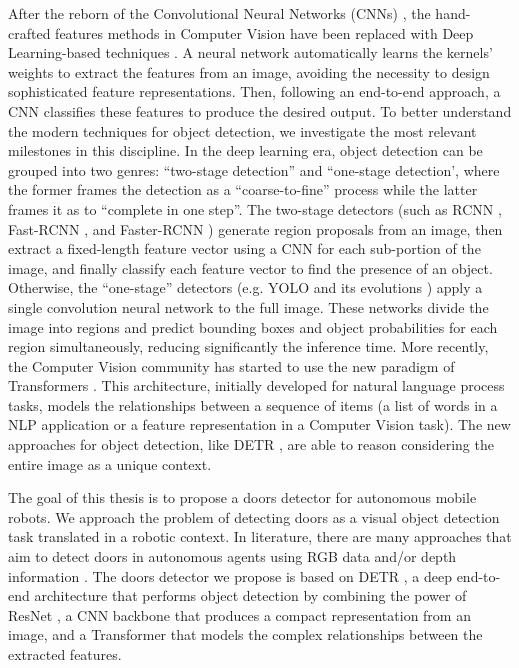 After the reborn of the Convolutional Neural Networks (CNNs) \cite{imagenetclassification}, the hand-crafted features methods in Computer Vision have been replaced with Deep Learning-based techniques \cite{deeplearningoverview}. A neural network automatically learns the kernels' weights to extract the features from an image, avoiding the necessity to design sophisticated feature representations. Then, following an end-to-end approach, a CNN classifies these features to produce the desired output. To better understand the modern techniques for object detection, we investigate the most relevant milestones in this discipline. In the deep learning era, object detection can be grouped
into two genres: ``two-stage detection'' and ``one-stage detection', where the former frames the detection as a ``coarse-to-fine'' process while the latter frames it as to ``complete in one step''. The two-stage detectors (such as RCNN \cite{rcnn}, Fast-RCNN \cite{fastrcnn}, and Faster-RCNN \cite{fasterrcnn})  generate region proposals from an image, then extract a fixed-length feature vector using a CNN for each sub-portion of the image, and finally classify each feature vector to find the presence of an object. Otherwise, the ``one-stage'' detectors (e.g. YOLO \cite{yolo} and its evolutions \cite{yolov2, yolov3}) apply a single convolution neural network to the
full image. These networks divide the image into regions
and predict bounding boxes and object probabilities for each
region simultaneously, reducing significantly the inference time. More recently, the Computer Vision community has started to use the new paradigm of Transformers \cite{transformer}. This architecture, initially developed for natural language process tasks, models the relationships between a sequence of items (a list of words in a NLP application or a feature representation in a Computer Vision task). The new approaches for object detection, like DETR \cite{detr}, are able to reason considering the entire image as a unique context.

The goal of this thesis is to propose a doors detector for autonomous mobile robots. We approach the problem of detecting doors as a visual object detection task translated in a robotic context. In literature, there are many approaches that aim to detect doors in autonomous agents using RGB data \cite{doorsandnavigation, detectdoorsfeature} and/or depth information \cite{doorcabinet}. The doors detector we propose is based on DETR \cite{detr}, a deep end-to-end architecture that performs object detection by combining the power of ResNet \cite{resnet}, a CNN backbone that produces a compact representation from an image, and a Transformer \cite{transformer} that models the complex relationships between the extracted features.

